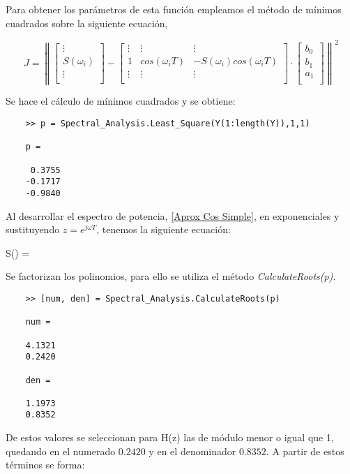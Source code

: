 \documentclass[a4paper, fontsize=11pt]{scrartcl} %
\numberwithin{equation}{section} %
\numberwithin{figure}{section} %
\numberwithin{table}{section} %
\newenvironment{myalign}{\par\nobreak\large\noindent\align}{\endalign} %
\begin{document}
	Para obtener los parámetros de esta función empleamos el método de mínimos cuadrados sobre la siguiente ecuación,
	
	\[ J = \left\| \left[ \begin{array}{c}
	\vdots \\
	S(\omega_i) \\
	\vdots \\
	\end{array} \right] - \left[ \begin{array}{ccc}
	\vdots & \vdots & \vdots \\
	1 & cos(\omega_i T) & -S(\omega_i)cos(\omega_i T) \\
	\vdots & \vdots & \vdots \\
	\end{array} \right] \cdot \left[ \begin{array}{c}
	b_0 \\
	b_1 \\
	a_1 \\
	\end{array} \right] \right\|^2  \] 
	
	Se hace el cálculo de mínimos cuadrados y se obtiene:
	
	\begin{lstlisting}
	>> p = Spectral_Analysis.Least_Square(Y(1:length(Y)),1,1)
		
	p =
	
	 0.3755
	-0.1717
	-0.9840
	\end{lstlisting}
	
	Al desarrollar el espectro de potencia, \ref{Aprox Cos Simple}, en exponenciales y sustituyendo $z=e^{j\omega T}$, tenemos la siguiente ecuación:
	
	\begin{myalign}
		S(\omega) = 
	\end{myalign}
	
	Se factorizan los polinomios, para ello se utiliza el método \textit{CalculateRoots(p)}.
	
	\begin{lstlisting}
	>> [num, den] = Spectral_Analysis.CalculateRoots(p)
	
	num =
	
	4.1321
	0.2420
		
	den =
	
	1.1973
	0.8352
	\end{lstlisting}
	
	De estos valores se seleccionan para H(z) las de módulo menor o igual que 1, quedando en el numerado $0.2420$ y en el denominador $0.8352$. A partir de estos términos se forma:
	
\end{document}
